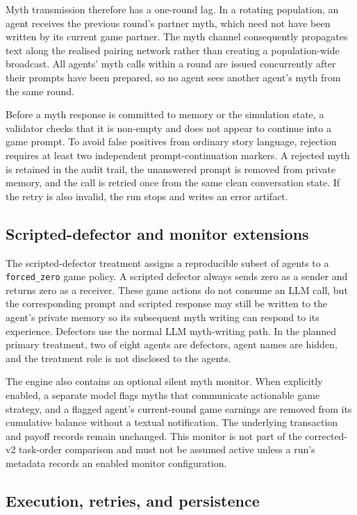 Myth transmission therefore has a one-round lag. In a rotating population, an
agent receives the previous round's partner myth, which need not have been
written by its current game partner. The myth channel consequently propagates
text along the realised pairing network rather than creating a population-wide
broadcast. All agents' myth calls within a round are issued concurrently after
their prompts have been prepared, so no agent sees another agent's myth from
the same round.

Before a myth response is committed to memory or the simulation state, a
validator checks that it is non-empty and does not appear to continue into a
game prompt. To avoid false positives from ordinary story language, rejection
requires at least two independent prompt-continuation markers. A rejected myth
is retained in the audit trail, the unanswered prompt is removed from private
memory, and the call is retried once from the same clean conversation state. If
the retry is also invalid, the run stops and writes an error artifact.

\subsection{Scripted-defector and monitor extensions}
\label{sec:protocol-extensions}

The scripted-defector treatment assigns a reproducible subset of agents to a
\texttt{forced\_zero} game policy. A scripted defector always sends zero as a
sender and returns zero as a receiver. These game actions do not consume an LLM
call, but the corresponding prompt and scripted response may still be written
to the agent's private memory so its subsequent myth writing can respond to its
experience. Defectors use the normal LLM myth-writing path. In the planned
primary treatment, two of eight agents are defectors, agent names are hidden,
and the treatment role is not disclosed to the agents.

The engine also contains an optional silent myth monitor. When explicitly
enabled, a separate model flags myths that communicate actionable game
strategy, and a flagged agent's current-round game earnings are removed from
its cumulative balance without a textual notification. The underlying
transaction and payoff records remain unchanged. This monitor is not part of
the corrected-v2 task-order comparison and must not be assumed active unless a
run's metadata records an enabled monitor configuration.

\subsection{Execution, retries, and persistence}
\label{sec:protocol-execution}


